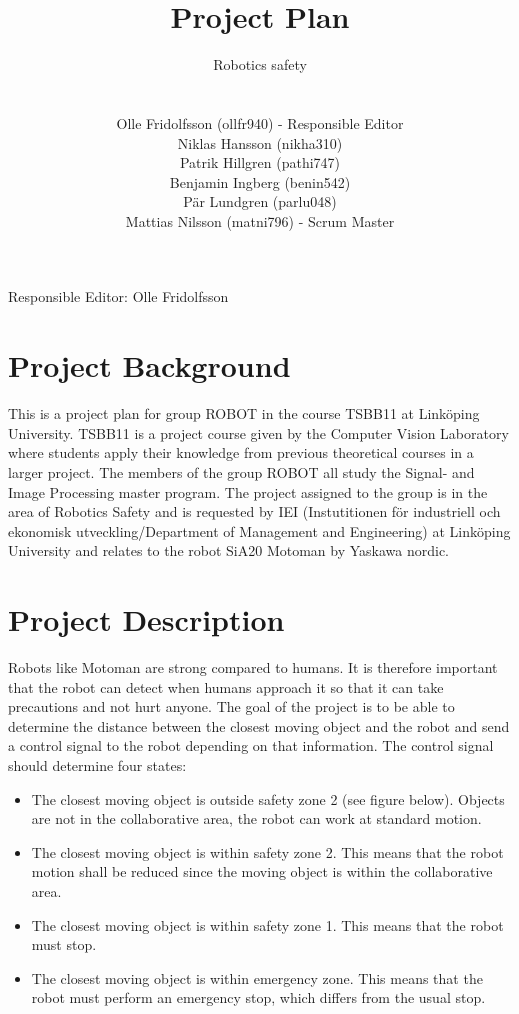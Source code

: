 \documentclass[10pt,a4paper]{article}
\title{Project Plan}
\author{\begin{large}{Robotics safety}\end{large}\\\\
Olle Fridolfsson (ollfr940) - Responsible Editor\\  Niklas Hansson (nikha310)\\ Patrik Hillgren (pathi747)\\ Benjamin Ingberg (benin542)\\ Pär Lundgren (parlu048)\\ Mattias Nilsson (matni796) - Scrum Master}
\begin{document}
\maketitle





\centerline{Responsible Editor: Olle Fridolfsson}
\newpage
\tableofcontents
\newpage
\noindent %
\section{Project Background}
This is a project plan for group ROBOT in the course TSBB11 at Linköping University. TSBB11 is a project course given by the Computer Vision Laboratory where students apply their knowledge from previous theoretical courses in a larger project. The members of the group ROBOT all study the Signal- and Image Processing master program. 
The project assigned to the group is in the area of Robotics Safety and is requested by IEI (Instutitionen för industriell och ekonomisk utveckling/Department of Management and Engineering) at Linköping University and relates to the robot SiA20 Motoman by Yaskawa nordic. 

\section{Project Description}
Robots like Motoman are strong compared to humans. It is therefore important that the robot can detect when humans approach it so that it can take precautions and not hurt anyone. The goal of the project is to be able to determine the distance between the closest moving object and the robot and send a control signal to the robot depending on that information. The control signal should determine four states:

\begin{itemize}
  \item The closest moving object is outside safety zone 2 (see figure below). Objects are not in the collaborative area, the robot can work at standard motion.
  \item The closest moving object is within safety zone 2. This means that the robot motion shall be reduced since the moving object is within the collaborative area.
  \item The closest moving object is within safety zone 1. This means that the robot must stop.
  \item The closest moving object is within emergency zone. This means that the robot must perform an emergency stop, which differs from the usual stop.
\end{itemize}
\end{document}
